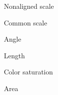 \documentclass[]{article}
\newcommand{\setwidth}{0.40\textwidth}
\newcommand{\setheight}{0.14934\paperheight}
\begin{document}
\noindent\hrulefill
\newpage


\hspace*{\fill}
\begin{minipage}{\setwidth}
  \centering
  \vspace*{\setheight}
  Nonaligned scale
  \vspace*{\setheight}
\end{minipage} %
\hfill\vline\hfill
\begin{minipage}{\setwidth}
  \centering
  \vspace*{\setheight}
  Common scale
  \vspace*{\setheight}
\end{minipage}
\hspace*{\fill}

\noindent\hrulefill

\hspace*{\fill}
\begin{minipage}{\setwidth}
  \centering
  \vspace*{\setheight}
  Angle
  \vspace*{\setheight}
\end{minipage} %
\hfill\vline\hfill
\begin{minipage}{\setwidth}
  \centering
  \vspace*{\setheight}
  Length
  \vspace*{\setheight}
\end{minipage}
\hspace*{\fill}

\noindent\hrulefill

\hspace*{\fill}
\begin{minipage}{\setwidth}
  \centering
  \vspace*{\setheight}
  Color saturation
  \vspace*{\setheight}
\end{minipage} %
\hfill\vline\hfill
\begin{minipage}{\setwidth}
  \centering
  \vspace*{\setheight}
  Area
  \vspace*{\setheight}
\end{minipage}
\hspace*{\fill}

\noindent\hrulefill
\end{document}
